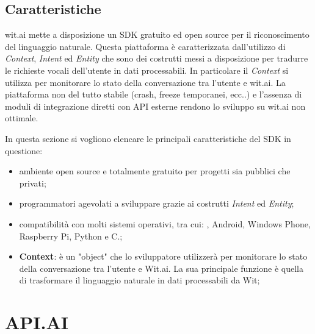 \documentclass[a4paper,titlepage]{article}
\begin{document}
		\subsection{Caratteristiche}

			wit.ai mette a disposizione un SDK gratuito ed open source per il riconoscimento del linguaggio naturale. Questa piattaforma è caratterizzata dall'utilizzo di \textit{Context}, \textit{Intent} ed \textit{Entity} che sono dei costrutti messi a disposizione per tradurre le richieste vocali dell'utente in dati processabili. In particolare il \textit{Context} si utilizza per monitorare lo stato della conversazione tra l'utente e wit.ai.
			La piattaforma non del tutto stabile (crash, freeze temporanei, ecc..) e l'assenza di moduli di integrazione diretti con API esterne rendono lo sviluppo su wit.ai non ottimale.

In questa sezione si vogliono elencare le principali caratteristiche del SDK in questione:
\begin{itemize}
	\item ambiente open source e totalmente gratuito per progetti sia pubblici che privati;
	\item programmatori agevolati a sviluppare grazie ai costrutti \textit{Intent} ed \textit{Entity}; 
	\item compatibilità con molti sistemi operativi, tra cui: , Android, Windows Phone, Raspberry Pi, Python e C.;
	\item \textbf{Context}: è un "object" che lo sviluppatore utilizzerà per monitorare lo stato della conversazione tra l'utente e Wit.ai. La sua principale funzione è quella di trasformare il linguaggio naturale in dati processabili da Wit;	
\end{itemize}	

		
\newpage
\section{API.AI}
\end{document}
